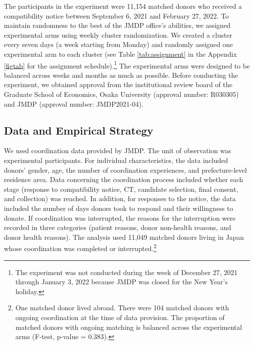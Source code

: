 \documentclass[12pt, a4paper]{article}
\begin{document}
The participants in the experiment were 11,154 matched donors who received a compatibility notice between September 6, 2021 and February 27, 2022. To maintain randomness to the best of the JMDP office's abilities, we assigned experimental arms using weekly cluster randomization. We created a cluster every seven days (a week starting from Monday) and randomly assigned one experimental arm to each cluster (see Table \ref{tab:assignment} in the Appendix \ref{figtab} for the assignment schedule).\footnote{The experiment was not conducted during the week of December 27, 2021 through January 3, 2022 because JMDP was closed for the New Year's holiday.} The experimental arms were designed to be balanced across weeks and months as much as possible. Before conducting the experiment, we obtained approval from the institutional review board of the Graduate School of Economics, Osaka University (approval number: R030305) and JMDP (approval number: JMDP2021-04).

\hypertarget{data-and-empirical-strategy}{%
\subsection{Data and Empirical Strategy}\label{data-and-empirical-strategy}}

We used coordination data provided by JMDP. The unit of observation was experimental participants. For individual characteristics, the data included donors' gender, age, the number of coordination experiences, and prefecture-level residence area. Data concerning the coordination process included whether each stage (response to compatibility notice, CT, candidate selection, final consent, and collection) was reached. In addition, for responses to the notice, the data included the number of days donors took to respond and their willingness to donate. If coordination was interrupted, the reasons for the interruption were recorded in three categories (patient reasons, donor non-health reasons, and donor health reasons). The analysis used 11,049 matched donors living in Japan whose coordination was completed or interrupted.\footnote{One matched donor lived abroad. There were 104 matched donors with ongoing coordination at the time of data provision. The proportion of matched donors with ongoing matching is balanced across the experimental arms (F-test, p-value = \(0.383\)).}
\end{document}
